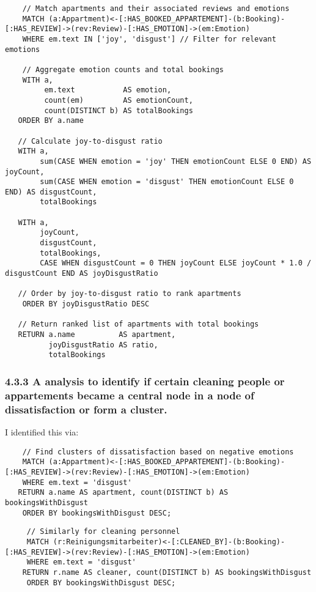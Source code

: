 \documentclass[
]{article}
\begin{document}
\begin{verbatim}
    // Match apartments and their associated reviews and emotions
    MATCH (a:Appartment)<-[:HAS_BOOKED_APPARTEMENT]-(b:Booking)-[:HAS_REVIEW]->(rev:Review)-[:HAS_EMOTION]->(em:Emotion)
    WHERE em.text IN ['joy', 'disgust'] // Filter for relevant emotions

    // Aggregate emotion counts and total bookings 
    WITH a, 
         em.text           AS emotion, 
         count(em)         AS emotionCount, 
         count(DISTINCT b) AS totalBookings
   ORDER BY a.name

   // Calculate joy-to-disgust ratio
   WITH a, 
        sum(CASE WHEN emotion = 'joy' THEN emotionCount ELSE 0 END) AS joyCount,
        sum(CASE WHEN emotion = 'disgust' THEN emotionCount ELSE 0 END) AS disgustCount,
        totalBookings

   WITH a, 
        joyCount,
        disgustCount, 
        totalBookings,
        CASE WHEN disgustCount = 0 THEN joyCount ELSE joyCount * 1.0 / disgustCount END AS joyDisgustRatio

   // Order by joy-to-disgust ratio to rank apartments
    ORDER BY joyDisgustRatio DESC

   // Return ranked list of apartments with total bookings
   RETURN a.name          AS apartment, 
          joyDisgustRatio AS ratio, 
          totalBookings
\end{verbatim}

\subsubsection{4.3.3 A analysis to identify if certain cleaning people
or appartements became a central node in a node of dissatisfaction or
form a
cluster.}\label{a-analysis-to-identify-if-certain-cleaning-people-or-appartements-became-a-central-node-in-a-node-of-dissatisfaction-or-form-a-cluster.}

I identified this via:

\begin{verbatim}
    // Find clusters of dissatisfaction based on negative emotions
    MATCH (a:Appartment)<-[:HAS_BOOKED_APPARTEMENT]-(b:Booking)-[:HAS_REVIEW]->(rev:Review)-[:HAS_EMOTION]->(em:Emotion)
    WHERE em.text = 'disgust'
   RETURN a.name AS apartment, count(DISTINCT b) AS bookingsWithDisgust
    ORDER BY bookingsWithDisgust DESC;
\end{verbatim}

\begin{verbatim}
     // Similarly for cleaning personnel
     MATCH (r:Reinigungsmitarbeiter)<-[:CLEANED_BY]-(b:Booking)-[:HAS_REVIEW]->(rev:Review)-[:HAS_EMOTION]->(em:Emotion)
     WHERE em.text = 'disgust'
    RETURN r.name AS cleaner, count(DISTINCT b) AS bookingsWithDisgust
     ORDER BY bookingsWithDisgust DESC;
\end{verbatim}
\end{document}
